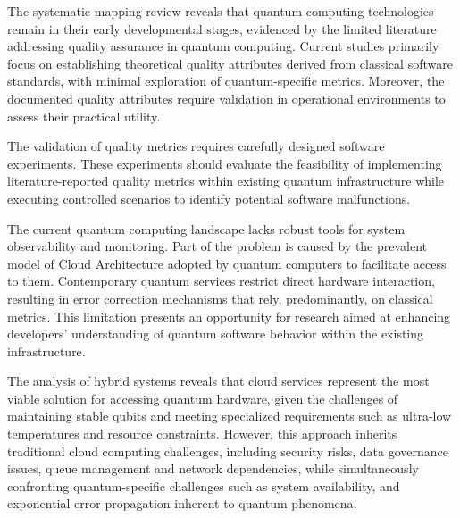 The systematic mapping review reveals that quantum computing technologies remain in their early developmental stages, evidenced by the limited literature addressing quality assurance in quantum computing. Current studies primarily focus on establishing theoretical quality attributes derived from classical software standards, with minimal exploration of quantum-specific metrics. Moreover, the documented quality attributes require validation in operational environments to assess their practical utility.

The validation of quality metrics requires carefully designed software experiments. These experiments should evaluate the feasibility of implementing literature-reported quality metrics within existing quantum infrastructure while executing controlled scenarios to identify potential software malfunctions.

The current quantum computing landscape lacks robust tools for system observability and monitoring. Part of the problem is caused by the prevalent model of Cloud Architecture adopted by quantum computers to facilitate access to them. Contemporary quantum services restrict direct hardware interaction, resulting in error correction mechanisms that rely, predominantly, on classical metrics. This limitation presents an opportunity for research aimed at enhancing developers' understanding of quantum software behavior within the existing infrastructure.

The analysis of hybrid systems reveals that cloud services represent the most viable solution for accessing quantum hardware, given the challenges of maintaining stable qubits and meeting specialized requirements such as ultra-low temperatures and resource constraints. However, this approach inherits traditional cloud computing challenges, including security risks, data governance issues, queue management and network dependencies, while simultaneously confronting quantum-specific challenges such as system availability, and exponential error propagation inherent to quantum phenomena.
